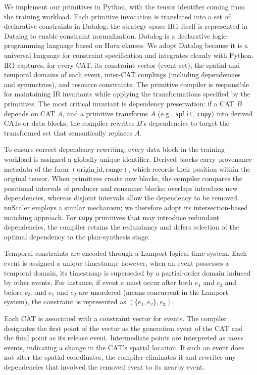 \documentclass[letterpaper,twocolumn,10pt]{article}
\begin{document}
We implement our primitives in Python, with the tensor identifier coming from the training workload. Each primitive invocation is translated into a set of declarative constraints in Datalog; the strategy-space IR1 itself is represented in Datalog to enable constraint normalization. Datalog is a declarative logic-programming language based on Horn clauses. We adopt Datalog because it is a universal language for constraint specification and integrates cleanly with Python. IR1 captures, for every CAT, its constraint vector (event set), the spatial and temporal domains of each event, inter-CAT couplings (including dependencies and symmetries), and resource constraints. The primitive compiler is responsible for maintaining IR invariants while applying the transformations specified by the primitives. The most critical invariant is dependency preservation: if a CAT $B$ depends on CAT $A$, and a primitive transforms $A$ (e.g., \texttt{split}, \texttt{copy}) into derived CATs or data blocks, the compiler rewrites $B$'s dependencies to target the transformed set that semantically replaces $A$.

To ensure correct dependency rewriting, every data block in the training workload is assigned a globally unique identifier. Derived blocks carry provenance metadata of the form $(\text{origin\_id}, \text{range})$, which records their position within the original tensor. When primitives create new blocks, the compiler compares the positional intervals of producer and consumer blocks: overlaps introduce new dependencies, whereas disjoint intervals allow the dependency to be removed. nnScaler employs a similar mechanism; we therefore adopt its intersection-based matching approach. For \texttt{copy} primitives that may introduce redundant dependencies, the compiler retains the redundancy and defers selection of the optimal dependency to the plan-synthesis stage.

Temporal constraints are encoded through a Lamport logical time system. Each event is assigned a unique timestamp; however, when an event possesses a temporal domain, its timestamp is superseded by a partial-order domain induced by other events. For instance, if event $e$ must occur after both $e_1$ and $e_2$ and before $e_3$, and $e_1$ and $e_2$ are unordered (means concurrent in the Lamport system), the constraint is represented as $(\{e_1,e_2\},e_3)$.

Each CAT is associated with a constraint vector for events. The compiler designates the first point of the vector as the generation event of the CAT and the final point as its release event. Intermediate points are interpreted as \emph{move} events, indicating a change in the CAT's spatial location. If such an event does not alter the spatial coordinates, the compiler eliminates it and rewrites any dependencies that involved the removed event to its nearby event.
\end{document}
